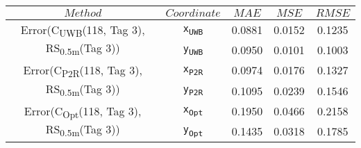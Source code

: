 \begin{table}[h]
\centering
\begin{tabular}{|c|c|c|c|c|}
\hline
$Method$ & $Coordinate$ & $MAE$ & $MSE$ & $RMSE$ \\
\hline
\multirow{2}{*}{{\footnotesize Error(C\textsubscript{UWB}(118, Tag 3), RS\textsubscript{0.5m}(Tag 3))}} & \texttt{x\textsubscript{UWB}} & 0.0881 & 0.0152 & 0.1235 \\
& \texttt{y\textsubscript{UWB}} & 0.0950 & 0.0101 & 0.1003 \\
\hline
\multirow{2}{*}{{\footnotesize Error(C\textsubscript{P2R}(118, Tag 3), RS\textsubscript{0.5m}(Tag 3))}} & \texttt{x\textsubscript{P2R}} & 0.0974 & 0.0176 & 0.1327 \\
& \texttt{y\textsubscript{P2R}} & 0.1095 & 0.0239 & 0.1546 \\
\hline
\multirow{2}{*}{{\footnotesize Error(C\textsubscript{Opt}(118, Tag 3), RS\textsubscript{0.5m}(Tag 3))}} & \texttt{x\textsubscript{Opt}} & 0.1950 & 0.0466 & 0.2158 \\
& \texttt{y\textsubscript{Opt}} & 0.1435 & 0.0318 & 0.1785 \\
\hline
\end{tabular}
\end{table}
